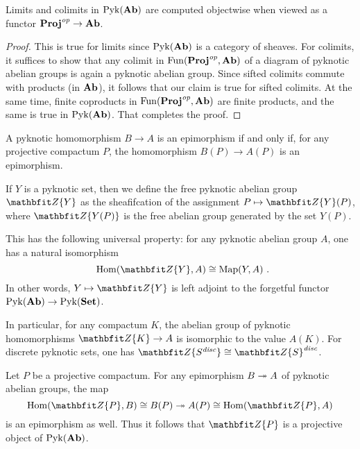 \begin{prp}
	Limits and colimits in $ \operatorname{Pyk}(\textbf{\textup{Ab}}) $ are computed objectwise when viewed as a functor $ \textbf{\textup{Proj}}^{\textit{op}} \to \textbf{\textup{Ab}} $.
\end{prp}

\begin{proof}
	This is true for limits since $ \operatorname{Pyk}(\textbf{\textup{Ab}}) $ is a category of sheaves.
	For colimits, it suffices to show that any colimit in $ \operatorname{Fun}(\textbf{\textup{Proj}}^{\textit{op}}, \textbf{\textup{Ab}}) $ of a diagram of pyknotic abelian groups is again a pyknotic abelian group.
	Since sifted colimits commute with products (in $ \textbf{\textup{Ab}} $), it follows that our claim is true for sifted colimits.
	At the same time, finite coproducts in $ \operatorname{Fun}(\textbf{\textup{Proj}}^{\textit{op}}, \textbf{\textup{Ab}}) $ are finite products, and the same is true in $ \operatorname{Pyk}(\textbf{\textup{Ab}}) $.
	That completes the proof.
\end{proof}

\begin{cor}
	A pyknotic homomorphism $ B \to A $ is an epimorphism if and only if, for any projective compactum $ P $, the homomorphism $ B(P) \to A(P) $ is an epimorphism.
\end{cor}

\begin{exm}
	If $ Y $ is a pyknotic set, then we define the free pyknotic abelian group $ \ZZ \{ Y \} $ as the sheafifcation of the assignment $ P \mapsto \ZZ \{ Y \}(P) $, where $ \ZZ \{ Y(P) \} $ is the free abelian group generated by the set $ Y(P) $.

	This has the following universal property: for any pyknotic abelian group $ A $, one has a natural isomorphism
	\[
		\Hom(\ZZ \{ Y \}, A) \cong \Map(Y, A) \period
	\]
	In other words, $ Y \mapsto \ZZ \{ Y \} $ is left adjoint to the forgetful functor $ \operatorname{Pyk}(\textbf{\textup{Ab}}) \to \operatorname{Pyk}(\textbf{\textup{Set}}) $.

	In particular, for any compactum $ K $, the abelian group of pyknotic homomorphisms $ \ZZ \{ K \} \to A $ is isomorphic to the value $ A(K) $.
	For discrete pyknotic sets, one has $ \ZZ \{ S^{\disc} \} \cong {\ZZ \{ S \}}^{\disc}$. 
\end{exm}

\begin{exm}
	Let $ P $ be a projective compactum.
	For any epimorphism $ B \twoheadrightarrow A $ of pyknotic abelian groups, the map
	\[
		\Hom(\ZZ \{ P \}, B) \cong B(P) \surjection A(P) \cong \Hom(\ZZ \{ P \}, A)
	\]
	is an epimorphism as well.
	Thus it follows that $ \ZZ \{ P \} $ is a projective object of $ \operatorname{Pyk}(\textbf{\textup{Ab}}) $.
\end{exm}

